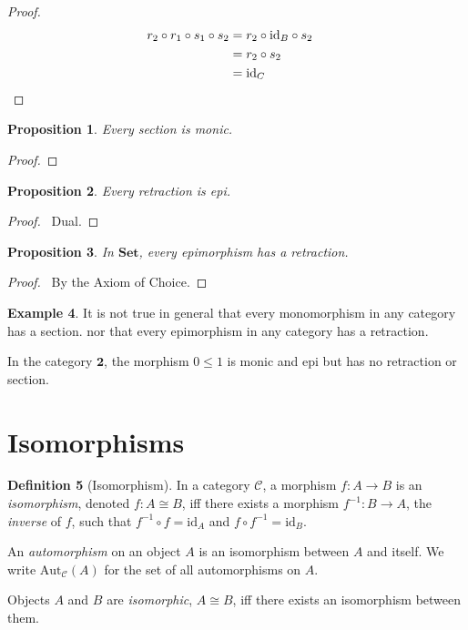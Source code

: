 \documentclass{book}
\let\qed\relax
\newtheorem{prop}{Proposition}[chapter]
\theoremstyle{definition}
\newtheorem{df}[prop]{Definition}
\newtheorem{ex}[prop]{Example}
\newcommand{\id}[1]{\ensuremath{\mathrm{id}_{#1}}}
\newcommand{\Set}{\ensuremath{\mathbf{Set}}}
\begin{document}
\begin{proof}
    \pf
    \begin{align*}
        r_2 \circ r_1 \circ s_1 \circ s_2 & = r_2 \circ \id{B} \circ s_2 \\
        & = r_2 \circ s_2 \\
        & = \id{C} & \qed
    \end{align*}
\end{proof}

\begin{prop}
    Every section is monic.
\end{prop}

\begin{proof}
    \pf
    \qed
\end{proof}

\begin{prop}
    Every retraction is epi.
\end{prop}

\begin{proof}
    \pf\ Dual. \qed
\end{proof}

\begin{prop}
    In $\Set$, every epimorphism has a retraction.
\end{prop}

\begin{proof}
    \pf\ By the Axiom of Choice. \qed
\end{proof}

\begin{ex}
    It is not true in general that every monomorphism in any category has a section. nor that every epimorphism in any category has a retraction.

    In the category $\mathbf{2}$, the morphism $0 \leq 1$ is monic and epi but has no retraction or section.
\end{ex}


\section{Isomorphisms}

\begin{df}[Isomorphism]
    In a category $\mathcal{C}$, a morphism $f : A \rightarrow B$ is an \emph{isomorphism}, denoted $f : A \cong B$, iff there exists a morphism $f^{-1} : B \rightarrow A$, the \emph{inverse} of $f$, such that $f^{-1} \circ f = \id{A}$ and $f \circ f^{-1} = \id{B}$.

    An \emph{automorphism} on an object $A$ is an isomorphism between $A$ and itself. We write $\mathrm{Aut}_\mathcal{C}(A)$ for the set of all automorphisms on $A$.

    Objects $A$ and $B$ are \emph{isomorphic}, $A \cong B$, iff there exists an isomorphism between them.
\end{df}
\end{document}
